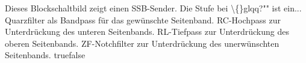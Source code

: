     {Dieses Blockschaltbild zeigt einen SSB-Sender. Die Stufe bei \textbackslash\{\}glqq?"" ist ein...}
    {Quarzfilter als Bandpass für das gewünschte Seitenband.}
    {RC-Hochpass zur Unterdrückung des unteren Seitenbands.}
    {RL-Tiefpass zur Unterdrückung des oberen Seitenbands.}
    {ZF-Notchfilter zur Unterdrückung des unerwünschten Seitenbands.}
    {true}{false}